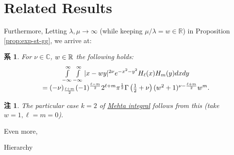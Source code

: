 \documentclass[pdf,notes]{beamer}
\newtheorem{remark}{注}
\newtheorem{cor}{系}
\begin{document}
\section{Related Results}
\begin{frame}
	Furthermore,
	Letting $\lambda,\mu\to\infty$ (while keeping $\mu/\lambda=w\in\mathbb{R}$) in Proposition \ref{prop:exp-st-gg}, we arrive at:
	\begin{cor}\label{cor:int-xzy-hh}
		For $\nu\in\mathbb{C}$, $w\in\R$ the following holds:
		\begin{equation*}
			\begin{array}[]{c}
			\int_{- \infty}^{\infty} \int_{- \infty}^{\infty} | x - w y |^{2 \nu} e^{-
			x^2 - y^2} H_\ell (x) H_m (y) d x d y \\= (- \nu)_{\frac{\ell + m}{2}} (- 1)^{\frac{\ell
			- m}{2}} 2^{\ell + m} \pi^{\frac{1}{2}} \Gamma \left( \frac{1}{2} + \nu \right)
			(w^2 + 1)^{\nu - \frac{\ell + m}{2}} w^m .
			\end{array}
		\end{equation*}
	\end{cor}
	\begin{remark}
		The particular case $k=2$ of \underline{Mehta integral} follows from this (take $w=1,\ell=m=0$).
	\end{remark}
	Even more,
\end{frame}
\begin{frame}[fragile]{Hierarchy}
\begin{tikzpicture}

\end{tikzpicture}
\end{frame}
\end{document}
